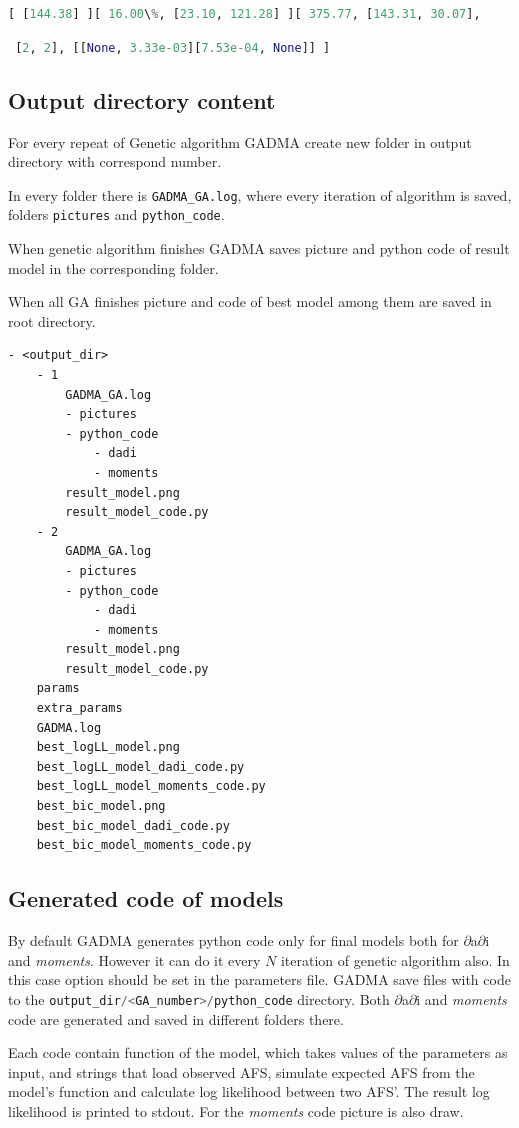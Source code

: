 \documentclass[12pt]{article}
\makeatletter
\newcommand{\dadi}{$\partial$a$\partial$i\xspace}
\newcommand{\moments}{\textit{moments}\xspace}
\newcommand{\py}[1]{\lstinline[language=Python, showstringspaces=False]@#1@}
\makeatother
\begin{document}
\py{[ [144.38] ][ 16.00\%, [23.10, 121.28] ][ 375.77, [143.31, 30.07],}

\hspace{6cm} \py{ [2, 2], [[None, 3.33e-03][7.53e-04, None]] ]}


\subsection{Output directory content}

For every repeat of Genetic algorithm GADMA create new folder in output directory with correspond number.

In every folder there is \py{GADMA_GA.log}, where every iteration of algorithm is saved, folders \py{pictures} and \py{python_code}.

When genetic algorithm finishes GADMA saves picture and python code of result model in the corresponding folder.

When all GA finishes picture and code of best model among them are saved in root directory.
\begin{lstlisting}
- <output_dir>
	- 1
		GADMA_GA.log
		- pictures
		- python_code
			- dadi
			- moments
		result_model.png
		result_model_code.py
	- 2
		GADMA_GA.log
		- pictures
		- python_code
			- dadi
			- moments
		result_model.png
		result_model_code.py
	params
	extra_params
	GADMA.log
	best_logLL_model.png
	best_logLL_model_dadi_code.py
	best_logLL_model_moments_code.py
	best_bic_model.png
	best_bic_model_dadi_code.py
	best_bic_model_moments_code.py
\end{lstlisting}

\subsection{Generated code of models}


By default GADMA generates python code only for final models both for \dadi and \moments. However it can do it every $N$ iteration of genetic algorithm also. In this case option \py{} should be set in the parameters file. GADMA save files with code to the \py{output_dir/<GA_number>/python_code} directory. Both \dadi and \moments code are generated and saved in different folders there. 

Each code contain function of the model, which takes values of the parameters as input, and strings that load observed AFS, simulate expected AFS from the model's function and calculate log likelihood between two AFS'. The result log likelihood is printed to stdout. For the \moments code picture is also draw.
\end{document}
